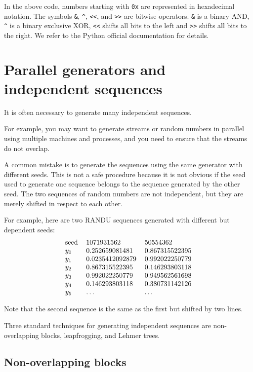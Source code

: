\documentclass[justified,sixbynine]{tufte-book}
\theoremstyle{plain}%
\theoremstyle{definition}
\theoremstyle{remark}
\begin{document}
\begin{fullwidth}
In the above code, numbers starting with \verb!0x! are represented in hexadecimal notation. The symbols \verb!&!, \verb!^!, \verb!<<!, and \verb!>>! are bitwise operators. \verb!&! is a binary AND,  \verb!^! is a binary exclusive XOR,  \verb!<<! shifts all bits to the left and  \verb!>>! shifts all bits to the right. We refer to the Python official documentation for details.

\goodbreak\section{Parallel generators and independent sequences}

It is often necessary to generate many independent sequences.

For example, you may want to generate streams or random numbers in parallel using multiple machines and processes, and you need to ensure that the streams do not overlap.

A common mistake is to generate the sequences using the same
generator with different seeds. This is not a safe procedure because it is
not obvious if the seed used to generate one sequence belongs to the
sequence generated by the other seed. The two
sequences of random numbers are not independent, but they are merely
shifted in respect to each other.

For example, here are two RANDU sequences generated with different but dependent
seeds:
\begin{equation}
\begin{tabular}{lll}
seed & 1071931562 & 50554362 \\
$y_0$ & 0.252659081481 & 0.867315522395 \\
$y_1$ & 0.0235412092879 & 0.992022250779 \\
$y_2$ & 0.867315522395 & 0.146293803118 \\
$y_3$ & 0.992022250779 & 0.949562561698 \\
$y_4$ & 0.146293803118 & 0.380731142126 \\
$y_5$ & \dots &\dots 
\end{tabular}
\end{equation}

Note that the second sequence is the same as the first but shifted by two
lines.

Three standard techniques for generating independent sequences are
non-overlapping blocks, leapfrogging, and Lehmer trees.

\goodbreak\subsection{Non-overlapping blocks}


\end{fullwidth}
\end{document}
